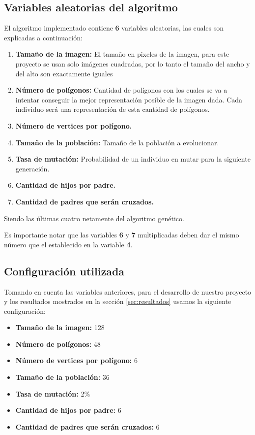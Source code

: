 \documentclass[11pt, spanish]{article}
\begin{document}
\subsection{Variables aleatorias del algoritmo}
El algoritmo implementado contiene \textbf{6} variables aleatorias, las
cuales son explicadas a continuación:

\begin{enumerate}
\item \textbf{Tamaño de la imagen:} El tamaño en pixeles de la imagen,
  para este proyecto se usan solo imágenes cuadradas, por lo tanto el
  tamaño del ancho y del alto son exactamente iguales

\item \textbf{Número de polígonos:} Cantidad de polígonos con los
  cuales se va a intentar conseguir la mejor representación posible de
  la imagen dada. Cada individuo será una representación de esta
  cantidad de polígonos.

\item \textbf{Número de vertices por polígono.}

\item \textbf{Tamaño de la población:} Tamaño de la población a
  evolucionar.

\item \textbf{Tasa de mutación:} Probabilidad de un individuo en mutar
  para la siguiente generación.

\item \textbf{Cantidad de hijos por padre.}

\item \textbf{Cantidad de padres que serán cruzados.}
\end{enumerate}

Siendo las últimas cuatro netamente del algoritmo genético.

Es importante notar que las variables \textbf{6} y \textbf{7}
multiplicadas deben dar el mismo número que el establecido en la
variable \textbf{4}.

\subsection{Configuración utilizada}
\label{subsec:configuracion}

Tomando en cuenta las variables anteriores, para el desarrollo de
nuestro proyecto y los resultados mostrados en la sección
\ref{sec:resultados} usamos la siguiente configuración:

\begin{itemize}
\item \textbf{Tamaño de la imagen:} 128
\item \textbf{Número de polígonos:} 48
\item \textbf{Número de vertices por polígono:} 6
\item \textbf{Tamaño de la población:} 36
\item \textbf{Tasa de mutación:} 2\%
\item \textbf{Cantidad de hijos por padre:} 6
\item \textbf{Cantidad de padres que serán cruzados:} 6
\end{itemize}
\end{document}
